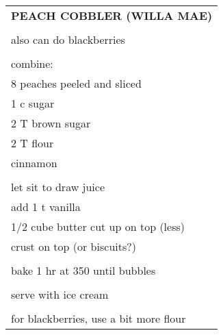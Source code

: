 \documentclass[8pt]{report}
\begin{document}
\newpage

\centering

\begin{tabular}{|l|} \hline	%
 
\multicolumn{1}{|c|}{\textbf{PEACH COBBLER (WILLA MAE)}}
\\
\\

\index{desserts!peach cobbler (willa mae)} \index{peach cobbler}

also can do blackberries\\
\\
combine:\\
\hspace{0.5 in} 8 peaches peeled and sliced\\
\hspace{0.5 in} 1 c sugar\\
\hspace{0.5 in} 2 T brown sugar\\
\hspace{0.5 in} 2 T flour\\
\hspace{0.5 in} cinnamon\\
\\
let sit to draw juice\\
add 1 t vanilla\\
1/2 cube butter cut up on top (less)\\
crust on top (or biscuits?)\\
\\
bake 1 hr at 350 until bubbles\\
\\
serve with ice cream\\
\\
for blackberries, use a bit more flour\\


\hline

\end{tabular}

\newpage

\centering
\end{document}
